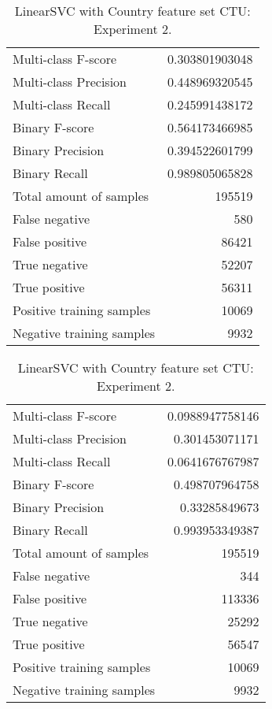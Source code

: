 \begin{table}[H]
\begin{minipage}{0.5\textwidth}
\caption{LinearSVC with Country feature set CTU: Experiment 1.}
\centering
\begin{tabular}{l r}
\toprule
Multi-class F-score & 0.303801903048 \\
Multi-class Precision & 0.448969320545 \\
Multi-class Recall & 0.245991438172 \\
\midrule
Binary F-score & 0.564173466985 \\
Binary Precision & 0.394522601799 \\
Binary Recall & 0.989805065828 \\
\midrule
Total amount of samples & 195519 \\
False negative & 580 \\
False positive & 86421 \\
True negative & 52207 \\
True positive & 56311 \\
\midrule
Positive training samples & 10069 \\
Negative training samples & 9932 \\
\bottomrule
\end{tabular}
\end{minipage}
\hfillx
\begin{minipage}{0.5\textwidth}
\caption{LinearSVC with Country feature set CTU: Experiment 2.}
\centering
\begin{tabular}{l r}
\toprule
Multi-class F-score & 0.0988947758146 \\
Multi-class Precision & 0.301453071171 \\
Multi-class Recall & 0.0641676767987 \\
\midrule
Binary F-score & 0.498707964758 \\
Binary Precision & 0.33285849673 \\
Binary Recall & 0.993953349387 \\
\midrule
Total amount of samples & 195519 \\
False negative & 344 \\
False positive & 113336 \\
True negative & 25292 \\
True positive & 56547 \\
\midrule
Positive training samples & 10069 \\
Negative training samples & 9932 \\
\bottomrule
\end{tabular}
\end{minipage}
\end{table}
